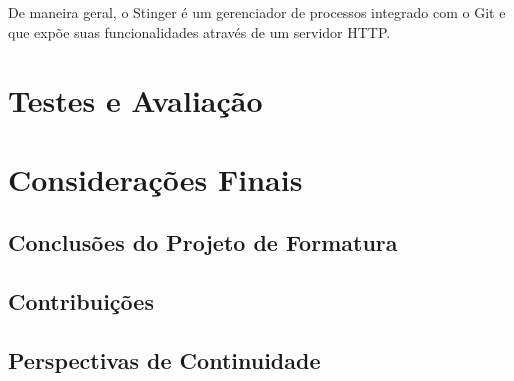 \documentclass[]{politex}
\begin{document}
	De maneira geral, o Stinger é um gerenciador de processos integrado com o Git e que expõe suas funcionalidades através de um servidor HTTP.

\chapter{Testes e Avaliação}
\chapter{Considerações Finais}
	\section{Conclusões do Projeto de Formatura}
	\section{Contribuições}
	\section{Perspectivas de Continuidade}





%

%

%




\end{document}
